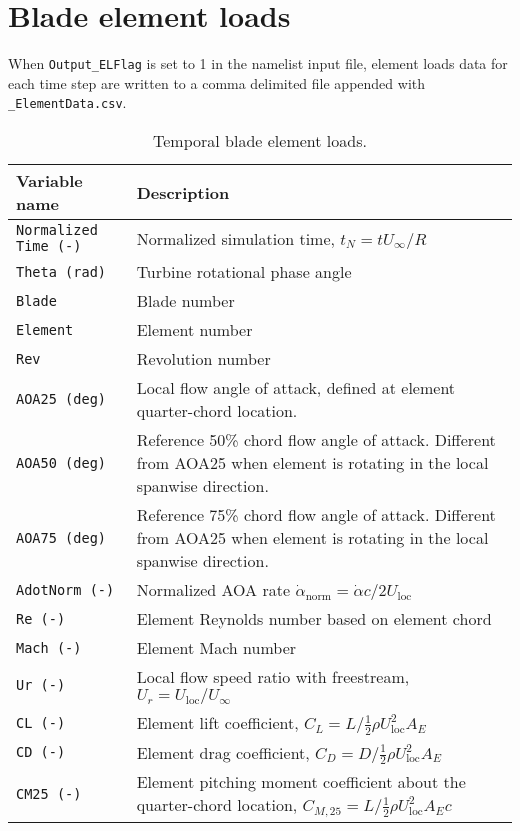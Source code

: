 \section{Blade element loads}
When \texttt{Output\_ELFlag} is set to 1 in the namelist input file, element loads data for each time step are written to a comma delimited file appended with \texttt{\_ElementData.csv}.

\begin{table}[!htbp]
\centering
\caption{Temporal blade element loads.}
\label{tbl:output_vars_blade}
\begin{tabular}{p{}p{}}
\toprule
Variable name & Description \\ \midrule
\texttt{Normalized Time (-)} & Normalized simulation time, $t_N=t U_\infty/R$ \\
\texttt{Theta (rad)}         & Turbine rotational phase angle \\
\texttt{Blade}               & Blade number \\
\texttt{Element}             & Element number \\
\texttt{Rev}                 & Revolution number \\
\texttt{AOA25 (deg)}         & Local flow angle of attack, defined at element quarter-chord location. \\
\texttt{AOA50 (deg)}         & Reference 50\% chord flow angle of attack. Different from AOA25 when element is rotating in the local spanwise direction. \\
\texttt{AOA75 (deg)}         & Reference 75\% chord flow angle of attack. Different from AOA25 when element is rotating in the local spanwise direction. \\
\texttt{AdotNorm (-)}        & Normalized AOA rate  $\dot{\alpha}_\textrm{norm} = \dot{\alpha} c / 2 U_\textrm{loc}$ \\ 
\texttt{Re (-)}              & Element Reynolds number based on element chord \\
\texttt{Mach (-)}            & Element Mach number \\
\texttt{Ur (-)}              & Local flow speed ratio with freestream, $U_r = U_\textrm{loc}/U_\infty$ \\ 
\texttt{CL (-)}              & Element lift coefficient, $C_L=L/{\frac{1}{2} \rho U_\textrm{loc}^2 A_E}$ \\
\texttt{CD (-)}              & Element drag coefficient, $C_D=D/{\frac{1}{2} \rho U_\textrm{loc}^2 A_E}$ \\
\texttt{CM25 (-)}            & Element pitching moment coefficient about the quarter-chord location, $C_{M,25}=L/{\frac{1}{2} \rho U_\textrm{loc}^2 A_E c}$ \\

\end{tabular}
\end{table}

